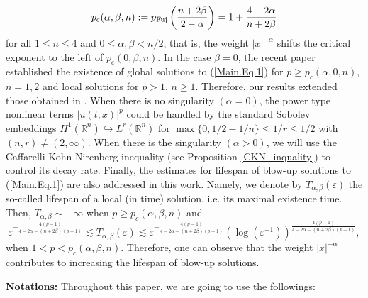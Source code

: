 \documentclass[11pt,reqno]{amsart}
\begin{document}
        \begin{align}
            p_{\rm c}(\alpha,\beta,n) := p_{\rm Fuj}\left(\frac{n+2\beta}{2-\alpha}\right) = 1 + \frac{4-2\alpha}{n+2\beta} \label{CriticalExponent}
        \end{align}
for all $1\leq n \leq 4$ and $0 \leq \alpha, \beta < n/2$, that is, the weight $|x|^{-\alpha}$ shifts the critical exponent to the left of $p_c(0, \beta, n)$. In the case $\beta = 0$, the recent paper \cite{NakamuraWadade2019} established the existence of global solutions to (\ref{Main.Eq.1}) for $p \geq p_c(\alpha, 0,n)$, $n=1,2$ and local solutions for $p>1$, $n \geq 1$. Therefore, our results extended those obtained in \cite{ChenReissig2023, Dabbicco2024, NakamuraWadade2019}. 
When there is no singularity $(\alpha = 0)$,  the power type nonlinear terms $|u(t,x)|^p$ could be handled by the standard Sobolev
embeddings $H^1(\mathbb{R}^n)  \hookrightarrow L^r(\mathbb{R}^n)$ for $\max\{0, 1/2-1/n\} \leq 1/r \leq 1/2$ with $(n, r) \ne (2, \infty)$.  When there is the singularity $(\alpha > 0)$, we will use the Caffarelli-Kohn-Nirenberg
inequality (see Proposition \ref{CKN_inquality}) to control its decay rate. Finally, the estimates for lifespan of blow-up solutions to (\ref{Main.Eq.1}) are also addressed in this work. Namely, we denote by $T_{\alpha, \beta}(\varepsilon)$ the so-called lifespan of a local (in time) solution, i.e. its maximal existence time. Then, $T_{\alpha, \beta} \sim +\infty$ when $p \geq p_c(\alpha, \beta, n)$ and 
        $$\varepsilon^{-\frac{4(p-1)}{4-2\alpha-(n+2\beta)(p-1)}} \lesssim T_{\alpha, \beta}(\varepsilon) \lesssim \varepsilon^{-\frac{4(p-1)}{4-2\alpha-(n+2\beta)(p-1)}} (\log(\varepsilon^{-1}))^{\frac{4(p-1)}{4-2\alpha-(n+2\beta)(p-1)}},$$
when $1 < p < p_c(\alpha, \beta,n)$.
Therefore, one can observe that the weight $|x|^{-\alpha}$ contributes to increasing the lifespan of blow-up solutions.

\vspace{0.2cm}
\textbf{Notations:} Throughout this paper, we are going to use the followings:
\end{document}

